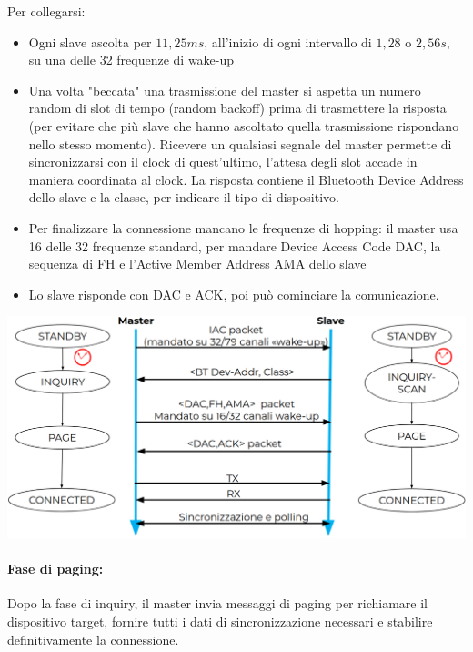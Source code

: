 Per collegarsi:
\begin{itemize}
    \item Ogni slave ascolta per $11,25 ms$, all'inizio di ogni intervallo di $1,28$ o $2,56 s$, su una delle 32 frequenze di wake-up
    
    \item Una volta "beccata" una trasmissione del master si aspetta un numero random di slot di tempo (random backoff) prima di trasmettere la risposta (per evitare che più slave che hanno ascoltato quella trasmissione rispondano nello stesso momento). Ricevere un qualsiasi segnale del master permette di sincronizzarsi con il clock di quest'ultimo, l'attesa degli slot accade in maniera coordinata al clock. La risposta contiene il Bluetooth Device Address dello slave e la classe, per indicare il tipo di dispositivo.
    
    \item Per finalizzare la connessione mancano le frequenze di hopping: il master usa 16 delle 32 frequenze standard, per mandare Device Access Code DAC, la sequenza di FH e l'Active Member Address AMA dello slave

    \item Lo slave risponde con DAC e ACK, poi può cominciare la comunicazione.
\end{itemize}
\begin{center}
	\includegraphics[width=0.95\linewidth]{img/wpan/inquiry1}
\end{center}


\paragraph{Fase di paging:} Dopo la fase di inquiry, il master invia messaggi di paging per richiamare il dispositivo target, fornire tutti i dati di sincronizzazione necessari e stabilire definitivamente la connessione.

